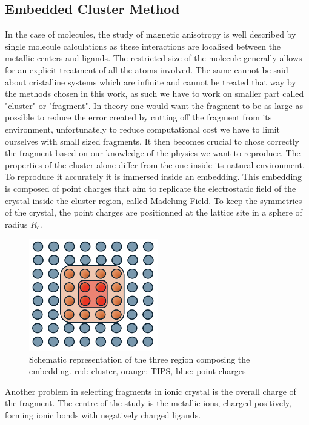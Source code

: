\documentclass[10pt]{report}
\numberwithin{equation}{section}
\begin{document}
\subsection{Embedded Cluster Method}

In the case of molecules, the study of magnetic anisotropy is well described by single molecule calculations as these interactions are localised between the metallic centers and ligands. 
The restricted size of the molecule generally allows for an explicit treatment of all the atoms involved.
The same cannot be said about cristalline systems which are infinite and cannot be treated that way by the methods chosen in this work, as such we have to work on smaller part called "cluster" or "fragment".
In theory one would want the fragment to be as large as possible to reduce the error created by cutting off the fragment from its environment, unfortunately to reduce computational cost we have to limit ourselves with small sized fragments. 
It then becomes crucial to chose correctly the fragment based on our knowledge of the physics we want to reproduce.
The properties of the cluster alone differ from the one inside its natural environment. To reproduce it accurately it is immersed inside an embedding. 
This embedding is composed of point charges that aim to replicate the electrostatic field of the crystal inside the cluster region, called Madelung Field. 
To keep the symmetries of the crystal, the point charges are positionned at the lattice site in a sphere of radius $R_c$. 
\begin{figure}[h!]
    \centering
    \includegraphics[width=0.5\textwidth]{Images/Bain.png}
    \caption{Schematic representation of the three region composing the embedding. red: cluster, orange: TIPS, blue: point charges}
    \label{Bain}
\end{figure}
Another problem in selecting fragments in ionic crystal is the overall charge of the fragment.
The centre of the study is the metallic ions, charged positively, forming ionic bonds with negatively charged ligands.
\end{document}
